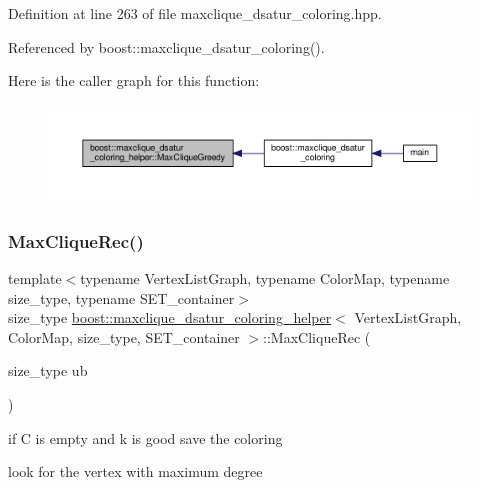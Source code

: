 Definition at line 263 of file maxclique\+\_\+dsatur\+\_\+coloring.\+hpp.



Referenced by boost\+::maxclique\+\_\+dsatur\+\_\+coloring().

Here is the caller graph for this function\+:
\nopagebreak
\begin{figure}[H]
\begin{center}
\leavevmode
\includegraphics[width=350pt]{d0/dd5/classboost_1_1maxclique__dsatur__coloring__helper_a0d161cb723d96561a6fd30413a84af53_icgraph}
\end{center}
\end{figure}
\mbox{\label{classboost_1_1maxclique__dsatur__coloring__helper_afd63b9cb7e6228c01fb266f19b7db9d3}} 
\subsubsection{\texorpdfstring{Max\+Clique\+Rec()}{MaxCliqueRec()}}
{\footnotesize\ttfamily template$<$typename Vertex\+List\+Graph, typename Color\+Map, typename size\+\_\+type, typename S\+E\+T\+\_\+container$>$ \\
size\+\_\+type \hyperlink{classboost_1_1maxclique__dsatur__coloring__helper}{boost\+::maxclique\+\_\+dsatur\+\_\+coloring\+\_\+helper}$<$ Vertex\+List\+Graph, Color\+Map, size\+\_\+type, S\+E\+T\+\_\+container $>$\+::Max\+Clique\+Rec (\begin{DoxyParamCaption}\item[{size\+\_\+type}]{ub }\end{DoxyParamCaption})\hspace{0.3cm}{\ttfamily [inline]}}

if C is empty and k is good save the coloring

look for the vertex with maximum degree

